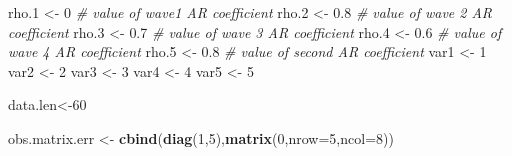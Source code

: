 \documentclass[]{article}
\newenvironment{Shaded}{\begin{snugshade}}{\end{snugshade}}
\newcommand{\KeywordTok}[1]{\textcolor[rgb]{0.13,0.29,0.53}{\textbf{#1}}}
\newcommand{\DataTypeTok}[1]{\textcolor[rgb]{0.13,0.29,0.53}{#1}}
\newcommand{\DecValTok}[1]{\textcolor[rgb]{0.00,0.00,0.81}{#1}}
\newcommand{\FloatTok}[1]{\textcolor[rgb]{0.00,0.00,0.81}{#1}}
\newcommand{\StringTok}[1]{\textcolor[rgb]{0.31,0.60,0.02}{#1}}
\newcommand{\CommentTok}[1]{\textcolor[rgb]{0.56,0.35,0.01}{\textit{#1}}}
\newcommand{\NormalTok}[1]{#1}
\begin{document}
\begin{Shaded}
\begin{Highlighting}[]
\NormalTok{  rho.}\DecValTok{1}\NormalTok{ <-}\StringTok{ }\DecValTok{0}     \CommentTok{# value of wave1  AR coefficient}
\NormalTok{  rho.}\DecValTok{2}\NormalTok{ <-}\StringTok{ }\FloatTok{0.8}                       \CommentTok{# value of wave 2  AR coefficient}
\NormalTok{  rho.}\DecValTok{3}\NormalTok{ <-}\StringTok{ }\FloatTok{0.7}                       \CommentTok{# value of wave 3 AR coefficient}
\NormalTok{  rho.}\DecValTok{4}\NormalTok{ <-}\StringTok{ }\FloatTok{0.6}                       \CommentTok{# value of wave 4 AR coefficient}
\NormalTok{  rho.}\DecValTok{5}\NormalTok{ <-}\StringTok{ }\FloatTok{0.8}                       \CommentTok{# value of second AR coefficient}
\NormalTok{  var1 <-}\StringTok{ }\DecValTok{1}
\NormalTok{  var2 <-}\StringTok{ }\DecValTok{2}
\NormalTok{  var3 <-}\StringTok{ }\DecValTok{3}
\NormalTok{  var4 <-}\StringTok{ }\DecValTok{4}
\NormalTok{  var5 <-}\StringTok{ }\DecValTok{5}

\NormalTok{  data.len<-}\DecValTok{60}    
    
\NormalTok{  obs.matrix.err <-}\StringTok{ }\KeywordTok{cbind}\NormalTok{(}\KeywordTok{diag}\NormalTok{(}\DecValTok{1}\NormalTok{,}\DecValTok{5}\NormalTok{),}\KeywordTok{matrix}\NormalTok{(}\DecValTok{0}\NormalTok{,}\DataTypeTok{nrow=}\DecValTok{5}\NormalTok{,}\DataTypeTok{ncol=}\DecValTok{8}\NormalTok{))}


\end{Highlighting}
\end{Shaded}
\end{document}
